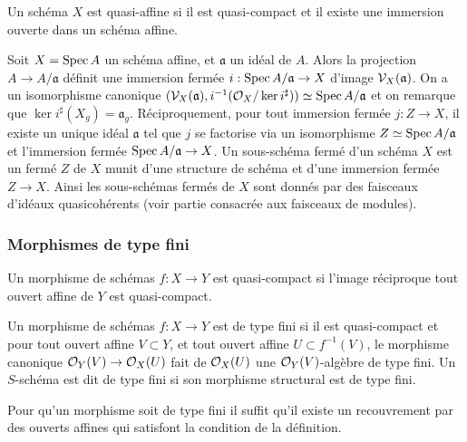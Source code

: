 \begin{defn}
Un schéma $X$ est quasi-affine si il est quasi-compact et il existe une immersion ouverte dans un schéma affine.
\end{defn}

Soit $X=\operatorname{Spec} A$ un schéma affine, et $\mathfrak{a}$ un idéal de $A$. Alors la projection $A\rightarrow A/\mathfrak{a}$ définit une immersion fermée $i:\operatorname{Spec} A/\mathfrak{a}\rightarrow X$ d'image $\mathcal{V}_X(\mathfrak{a})$. On a un isomorphisme canonique $(\mathcal{V}_X(\mathfrak{a}), i^{-1}(\mathcal{O}_X/\ker i^\sharp))\simeq \operatorname{Spec} A/\mathfrak{a}$ et on remarque que $\ker i^\sharp(X_g)=\mathfrak{a}_g$. Réciproquement, pour tout immersion fermée $j:Z\rightarrow X$, il existe un unique idéal $\mathfrak{a}$ tel que $j$ se factorise via un isomorphisme $Z\simeq \operatorname{Spec} A/\mathfrak{a}$ et l'immersion fermée $\operatorname{Spec} A/\mathfrak{a}\rightarrow X$. Un sous-schéma fermé d'un schéma $X$ est un fermé $Z$ de $X$ munit d'une structure de schéma et d'une immersion fermée $Z\rightarrow X$. Ainsi les sous-schémas fermés de $X$ sont donnés par des faisceaux d'idéaux quasicohérents (voir partie consacrée aux faisceaux de modules).



\subsubsection{Morphismes de type fini}

\begin{defn}
Un morphisme de schémas $f:X\rightarrow Y$ est quasi-compact si l'image réciproque tout ouvert affine de $Y$ est quasi-compact. 
\end{defn}

\begin{defn}
Un morphisme de schémas $f:X\rightarrow Y$ est de type fini si il est quasi-compact et pour tout ouvert affine $V\subset Y$, et tout ouvert affine $U\subset f^{-1}(V)$, le morphisme canonique $\mathcal{O}_Y(V)\rightarrow \mathcal{O}_X(U)$ fait de $\mathcal{O}_X(U)$ une $\mathcal{O}_Y(V)$-algèbre de type fini. Un $S$-schéma est dit de type fini si son morphisme structural est de type fini.
\end{defn}

\begin{rem}
Pour qu'un morphisme soit de type fini il suffit qu'il existe un recouvrement par des ouverts affines qui satisfont la condition de la définition.
\end{rem}

